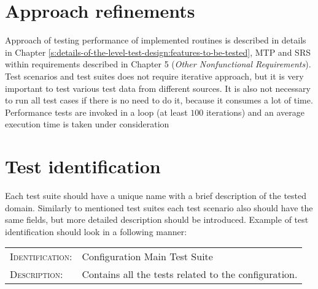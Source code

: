 \section{Approach refinements} \label{s:details-of-the-level-test-design:approach-refinements}
	\begin{comment}
		Specify refinements to the approach described in the corresponding Level Test Plan (if there is one;
		otherwise specify the entire approach). Include specific test techniques to be used. The method of
		analyzing test results should be identified (e.g., comparator tools, visual inspection, etc.).
		Summarize the common attributes of any test cases. This may include input constraints that must be
		true for every input in a set of associated test cases, any shared environmental needs, any shared
		special procedural requirements, and any shared case dependencies. Sets of associated test cases may
		be identified as scenarios (also commonly called scripts or suites). Test scenarios should be designed to
		be as reusable as possible for regression testing, revalidation testing for changes, and training new
		employees who must either use or support the system over time.
	\end{comment}
	Approach of testing performance of implemented routines is described in details in Chapter \ref{s:details-of-the-level-test-design:features-to-be-tested}, \gls{MTP} and \gls{SRS} within requirements described in Chapter 5 (\emph{Other Nonfunctional Requirements}). Test scenarios and test suites does not require iterative approach, but it is very important to test various test data from different sources. It is also not necessary to run all test cases if there is no need to do it, because it consumes a lot of time. Performance tests are invoked in a loop (at least $100$ iterations) and an average execution time is taken under consideration
\section{Test identification} \label{s:details-of-the-level-test-design:test-identification}
	\begin{comment}
		List the identifier and a brief description of each test case (or set of related test cases) in scenarios for
		this design. A particular test case, scenario, or procedure may be identified in more than one LTD. List
		the identifier and a brief description of each procedure associated with this LTD.
	\end{comment}
	Each test suite should have a unique name with a brief description of the tested domain. Similarly to mentioned test suites each test scenario also should have the same fields, but more detailed description should be introduced. Example of test identification should look in a following manner: \\
	\begin{center}
		\boxed
		{
			\begin{tabular}{ll}
				\textsc{Identification:} & Configuration Main Test Suite \\
				\textsc{Description:} & Contains all the tests related to the configuration.
			\end{tabular}
		}
	\end{center}
